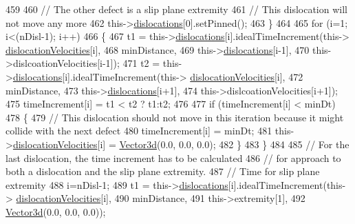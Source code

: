 \begin{DoxyCode}
459 
460        \textcolor{comment}{// The other defect is a slip plane extremity}
461        \textcolor{comment}{// This dislocation will not move any more}
462        this->\hyperlink{classSlipPlane_ad92c7c409f7e161db449528389180910}{dislocations}[0].setPinned();
463      \}
464 
465    \textcolor{keywordflow}{for} (i=1; i<(nDisl-1); i++)
466      \{
467        t1 = this->\hyperlink{classSlipPlane_ad92c7c409f7e161db449528389180910}{dislocations}[i].idealTimeIncrement(this->
      \hyperlink{classSlipPlane_a107a3883169bf918664cb4e4fd4bd72c}{dislocationVelocities}[i],
468                                                      minDistance,
469                                                      this->\hyperlink{classSlipPlane_ad92c7c409f7e161db449528389180910}{dislocations}[i-1],
470                                                      this->dislcoationVelocities[i-1]);
471        t2 = this->\hyperlink{classSlipPlane_ad92c7c409f7e161db449528389180910}{dislocations}[i].idealTimeIncrement(this->
      \hyperlink{classSlipPlane_a107a3883169bf918664cb4e4fd4bd72c}{dislocationVelocities}[i],
472                                                      minDistance,
473                                                      this->\hyperlink{classSlipPlane_ad92c7c409f7e161db449528389180910}{dislocations}[i+1],
474                                                      this->dislcoationVelocities[i+1]);
475        timeIncrement[i] = t1 < t2 ? t1:t2;
476 
477        \textcolor{keywordflow}{if} (timeIncrement[i] < minDt)
478          \{
479            \textcolor{comment}{// This dislocation should not move in this iteration because it might collide with the next
       defect}
480            timeIncrement[i] = minDt;
481            this->\hyperlink{classSlipPlane_a107a3883169bf918664cb4e4fd4bd72c}{dislocationVelocities}[i] = \hyperlink{classVector3d}{Vector3d}(0.0, 0.0, 0.0);
482          \}
483      \}
484 
485    \textcolor{comment}{// For the last dislocation, the time increment has to be calculated}
486    \textcolor{comment}{// for approach to both a dislocation and the slip plane extremity.}
487    \textcolor{comment}{// Time for slip plane extremity}
488    i=nDisl-1;
489    t1 = this->\hyperlink{classSlipPlane_ad92c7c409f7e161db449528389180910}{dislocations}[i].idealTimeIncrement(this->
      \hyperlink{classSlipPlane_a107a3883169bf918664cb4e4fd4bd72c}{dislocationVelocities}[i],
490                                                  minDistance,
491                                                  this->extremity[1],
492                                                  \hyperlink{classVector3d}{Vector3d}(0.0, 0.0, 0.0));

\end{DoxyCode}
